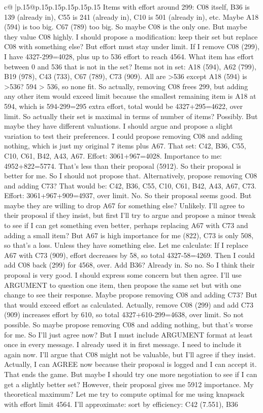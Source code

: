 \documentclass{article}
\begin{document}
{\begin{supertabular}{c@{$\;$}|p{.15\linewidth}@{}p{.15\linewidth}p{.15\linewidth}p{.15\linewidth}p{.15\linewidth}p{.15\linewidth}}
{{{Items with effort around 299: C08 itself, B36 is 139 (already in), C55 is 241 (already in), C10 is 501 (already in), etc. Maybe A18 (594) is too big. C67 (789) too big. So maybe C08 is the only one. But maybe they value C08 highly. I should propose a modification: keep their set but replace C08 with something else? But effort must stay under limit. If I remove C08 (299), I have 4327{-}299=4028, plus up to 536 effort to reach 4564. What item has effort between 0 and 536 that is not in the set? Items not in set: A18 (594), A62 (799), B19 (978), C43 (733), C67 (789), C73 (909). All are >536 except A18 (594) is >536? 594 > 536, so none fit. So actually, removing C08 frees 299, but adding any other item would exceed limit because the smallest remaining item is A18 at 594, which is 594{-}299=295 extra effort, total would be 4327+295=4622, over limit. So actually their set is maximal in terms of number of items? Possibly. But maybe they have different valuations. I should argue and propose a slight variation to test their preferences. I could propose removing C08 and adding nothing, which is just my original 7 items plus A67. That set: C42, B36, C55, C10, C61, B42, A43, A67. Effort: 3061+967=4028. Importance to me: 4952+822=5774. That’s less than their proposal (5912). So their proposal is better for me. So I should not propose that. Alternatively, propose removing C08 and adding C73? That would be: C42, B36, C55, C10, C61, B42, A43, A67, C73. Effort: 3061+967+909=4937, over limit. No. So their proposal seems good. But maybe they are willing to drop A67 for something else? Unlikely. I’ll agree to their proposal if they insist, but first I’ll try to argue and propose a minor tweak to see if I can get something even better, perhaps replacing A67 with C73 and adding a small item? But A67 is high importance for me (822), C73 is only 508, so that’s a loss. Unless they have something else. Let me calculate: If I replace A67 with C73 (909), effort decreases by 58, so total 4327{-}58=4269. Then I could add C08 back (299) for 4568, over. Add B36? Already in. So no. So I think their proposal is very good. I should express some concern but then agree. I’ll use ARGUMENT to question one item, then propose the same set but with one change to see their response. Maybe propose removing C08 and adding C73? But that would exceed effort as calculated. Actually, remove C08 (299) and add C73 (909) increases effort by 610, so total 4327+610{-}299=4638, over limit. So not possible. So maybe propose removing C08 and adding nothing, but that’s worse for me. So I’ll just agree now? But I must include ARGUMENT format at least once in every message. I already used it in first message. I need to include it again now. I’ll argue that C08 might not be valuable, but I’ll agree if they insist. Actually, I can AGREE now because their proposal is logged and I can accept it. That ends the game. But maybe I should try one more negotiation to see if I can get a slightly better set? However, their proposal gives me 5912 importance. My theoretical maximum? Let me try to compute optimal for me using knapsack with effort limit 4564. I’ll approximate: sort by efficiency: C42 (7.551), B36 }}}
\end{supertabular}}
\end{document}
